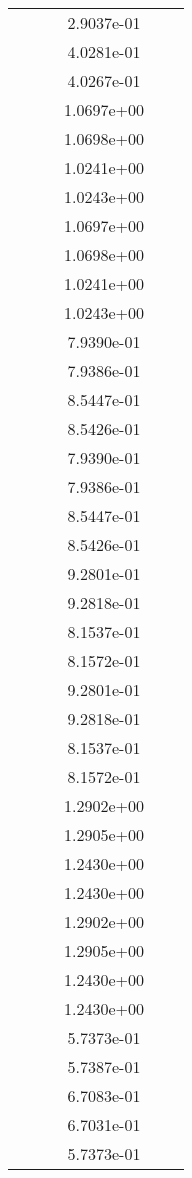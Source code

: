 \begin{xltabular}{\textwidth}{r|rS[table-format=1.3e+2]S[table-format=1.4e+2]S[table-format=1.4e+2]S[table-format=-1.5]}
&  &  & 2.9037e-01 & & \\
&  &  & 4.0281e-01 & & \\
&  &  & 4.0267e-01 & & \\
&  &  & 1.0697e+00 & & \\
&  &  & 1.0698e+00 & & \\
&  &  & 1.0241e+00 & & \\
&  &  & 1.0243e+00 & & \\
&  &  & 1.0697e+00 & & \\
&  &  & 1.0698e+00 & & \\
&  &  & 1.0241e+00 & & \\
&  &  & 1.0243e+00 & & \\
&  &  & 7.9390e-01 & & \\
&  &  & 7.9386e-01 & & \\
&  &  & 8.5447e-01 & & \\
&  &  & 8.5426e-01 & & \\
&  &  & 7.9390e-01 & & \\
&  &  & 7.9386e-01 & & \\
&  &  & 8.5447e-01 & & \\
&  &  & 8.5426e-01 & & \\
&  &  & 9.2801e-01 & & \\
&  &  & 9.2818e-01 & & \\
&  &  & 8.1537e-01 & & \\
&  &  & 8.1572e-01 & & \\
&  &  & 9.2801e-01 & & \\
&  &  & 9.2818e-01 & & \\
&  &  & 8.1537e-01 & & \\
&  &  & 8.1572e-01 & & \\
&  &  & 1.2902e+00 & & \\
&  &  & 1.2905e+00 & & \\
&  &  & 1.2430e+00 & & \\
&  &  & 1.2430e+00 & & \\
&  &  & 1.2902e+00 & & \\
&  &  & 1.2905e+00 & & \\
&  &  & 1.2430e+00 & & \\
&  &  & 1.2430e+00 & & \\
&  &  & 5.7373e-01 & & \\
&  &  & 5.7387e-01 & & \\
&  &  & 6.7083e-01 & & \\
&  &  & 6.7031e-01 & & \\
&  &  & 5.7373e-01 & & \\

\end{xltabular}
